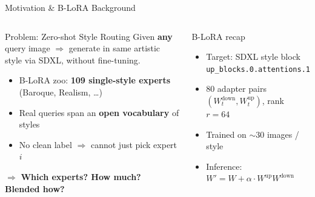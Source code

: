 \documentclass[aspectratio=169,10pt]{beamer}
\newcommand{\highlight}[1]{\textcolor{myorange}{\textbf{#1}}}
\begin{document}
\begin{frame}[shrink=10]{Motivation \& B-LoRA Background}
  \begin{columns}[T]
      \begin{block}{Problem: Zero-shot Style Routing}
        Given \highlight{any} query image $\Rightarrow$ generate in same artistic style via SDXL, without fine-tuning.
        \begin{itemize}
          \item B-LoRA zoo: \textbf{109 single-style experts} (Baroque, Realism, \ldots)
          \item Real queries span an \textbf{open vocabulary} of styles
          \item No clean label $\Rightarrow$ cannot just pick expert $i$
        \end{itemize}
        $\Rightarrow$ \highlight{Which experts? How much? Blended how?}
      \end{block}
      \begin{block}{B-LoRA recap}
        \begin{itemize}
          \item Target: SDXL style block \texttt{up\_blocks.0.attentions.1}
          \item 80 adapter pairs $(W^\text{down}_t, W^\text{up}_t)$, rank $r=64$
          \item Trained on $\sim\!30$ images / style
          \item Inference: $W' = W + \alpha \cdot W^\text{up} W^\text{down}$
        \end{itemize}
      \end{block}


\end{columns}
\end{frame}
\end{document}

